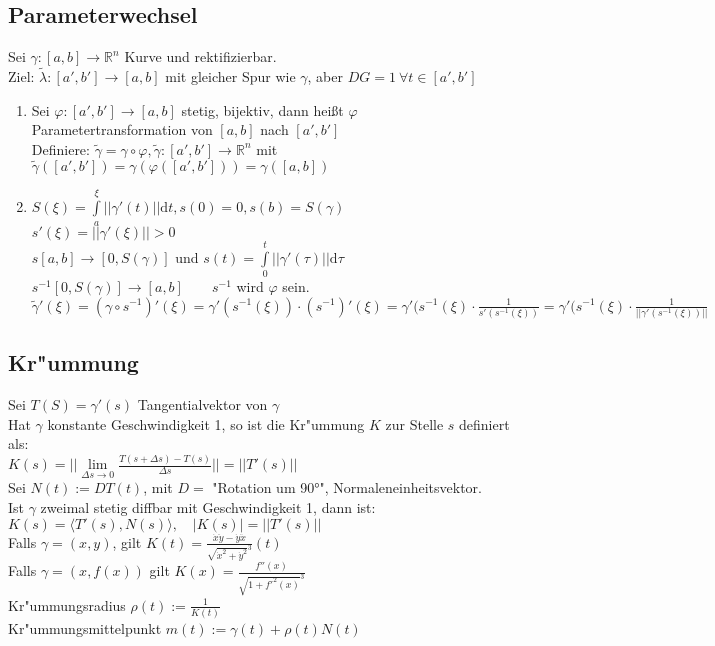 \documentclass[10pt,a4paper^, twocolumn]{article}
\newcommand{\menge}{\mathbb} %
\renewcommand{\phi}{\varphi} %
\renewcommand{\d}{\mathrm{d}} %
\begin{document}
\subsection{Parameterwechsel}
	Sei $\gamma : [a,b] \rightarrow \menge{R}^n$ Kurve und rektifizierbar. \\
	Ziel: $\tilde\lambda : [a', b'] \rightarrow [a,b]$ mit gleicher Spur wie $\gamma$, aber $DG = 1 \ \forall t \in [a', b']$ \\
	\begin{enumerate}
	\item{}  Sei $\phi:[a', b'] \rightarrow [a,b]$ stetig, bijektiv, dann heißt $\phi$ Parametertransformation von $[a,b]$ nach $[a',b']$ \\
	Definiere: $\tilde\gamma = \gamma \circ \phi, \tilde\gamma:[a', b'] \rightarrow \menge{R}^n$ mit $\tilde\gamma([a',b']) = \gamma(\phi([a',b'])) = \gamma([a,b])$ \\
	\item{} $S(\xi) = \int\limits_a^\xi ||\gamma'(t)|| \d t, s(0) = 0, s(b) = S(\gamma)$ \\
	$s'(\xi) = ||\gamma'(\xi)|| > 0$ \\
	$s [a,b] \rightarrow [0, S(\gamma)]$ und $s(t) = \int\limits_0^t ||\gamma'(\tau)|| \d \tau $ \\
	$s^{-1}[0,S(\gamma)] \rightarrow [a,b] \qquad s^{-1}$ wird $\phi$ sein. \\
	$\tilde\gamma'(\xi) = (\gamma \circ s^{-1})'(\xi) = \gamma'(s^{-1}(\xi)) \cdot (s^{-1})'(\xi) = 
	\gamma'(s^{-1}(\xi)\cdot \frac{1}{s'(s^{-1}(\xi))} = \gamma'(s^{-1}(\xi) \cdot \frac{1}{||\gamma'(s^{-1}(\xi))||}$
	\end{enumerate}

\subsection{Kr"ummung}
	Sei $T(S) = \gamma'(s)$ Tangentialvektor von $\gamma$ \\
	Hat $\gamma$ konstante Geschwindigkeit 1, so ist die Kr"ummung $K$ zur Stelle $s$ definiert als: \\
	$K(s) = || \lim\limits_{\Delta s \to 0} \frac{T(s + \Delta s) - T(s)}{\Delta s} || = || T'(s) ||$ \\
	Sei $N(t) := DT(t)$, mit $D =$ "Rotation um 90°", Normaleneinheitsvektor. \\
	Ist $\gamma$ zweimal stetig diffbar mit Geschwindigkeit 1, dann ist:
	$K(s) = \langle T'(s), N(s) \rangle, \quad | K(s) | = || T'(s) ||$ \\
	Falls $\gamma = (x,y)$, gilt $K(t) = \frac{\dot{x}\ddot{y} - \dot{y}\ddot{x}}{\sqrt{\dot{x}^2 + \dot{y}^2}^3} (t)$ \\
	Falls $\gamma = (x, f(x))$ gilt $K(x) = \frac{f''(x)}{\sqrt{1+f'^2(x)}^3}$ \\
	Kr"ummungsradius $\rho (t) := \frac{1}{K(t)}$ \\
	Kr"ummungsmittelpunkt $m(t) := \gamma(t) + \rho(t)N(t)$
\end{document}
